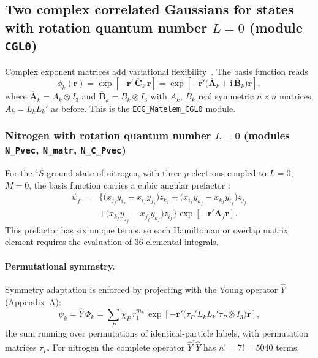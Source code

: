 \documentclass[11pt]{article}
\newcommand{\rvec}{\mathbf{r}}
\newcommand{\Ycal}{\hat{Y}}
\begin{document}
\subsection{Two complex correlated Gaussians for states with rotation quantum number \texorpdfstring{$L=0$}{L=0} (module \texttt{CGL0})}
\label{sec:cgl0}

Complex exponent matrices add variational flexibility~\cite{Bubin2013}. The
basis function reads
\begin{equation}
\phi_k(\rvec)=\exp\!\left[-\rvec'\,\overline{\mathbf{C}}_k\,\rvec\right]
=\exp\!\left[-\rvec'\big(\overline{\mathbf{A}}_k+\mathrm{i}\,\overline{\mathbf{B}}_k\big)\rvec\right],
\end{equation}
where $\overline{\mathbf{A}}_k=A_k\otimes I_3$ and
$\overline{\mathbf{B}}_k=B_k\otimes I_3$ with $A_k$, $B_k$ real symmetric
$n\times n$ matrices, $A_k=L_kL_k'$ as before. This is the
\texttt{ECG\_Matelem\_CGL0} module.

\subsubsection{Nitrogen with rotation quantum number \texorpdfstring{$L=0$}{L=0} (modules \texttt{N\_Pvec}, \texttt{N\_matr}, \texttt{N\_C\_Pvec})}
\label{sec:nitrogen}

For the $^4S$ ground state of nitrogen, with three $p$-electrons coupled to
$L=0$, $M=0$, the basis function carries a cubic angular prefactor
\cite{Sharkey2014}:
\begin{equation}
\begin{aligned}
\psi_f=&\Big\{\big(x_{j_f}y_{i_f}-x_{i_f}y_{j_f}\big)z_{k_f}
+\big(x_{i_f}y_{k_f}-x_{k_f}y_{i_f}\big)z_{j_f}\\
&+\big(x_{k_f}y_{j_f}-x_{j_f}y_{k_f}\big)z_{i_f}\Big\}
\exp\!\left[-\rvec'\mathbf{A}_f\rvec\right].
\end{aligned}
\end{equation}
This prefactor has six unique terms, so each Hamiltonian or overlap matrix
element requires the evaluation of $36$ elemental integrals.

\paragraph{Permutational symmetry.}
Symmetry adaptation is enforced by projecting with the Young operator $\Ycal$
(Appendix~A):
\begin{equation}
\psi_k=\Ycal\,\Phi_k=\sum_{P}\chi_P\, r_1^{m_k}\,
\exp\!\left[-\rvec'\big(\tau_P' L_kL_k'\tau_P\otimes I_3\big)\rvec\right],
\end{equation}
the sum running over permutations of identical-particle labels, with
permutation matrices $\tau_P$. For nitrogen the complete operator
$\Ycal^{\dagger}\Ycal$ has $n!=7!=5040$ terms.
\end{document}
